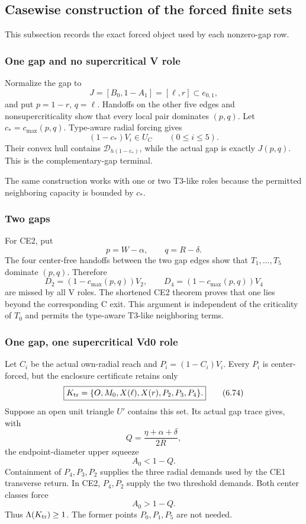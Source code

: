 \subsection{Casewise construction of the forced finite sets}
\label{subsec:new-casewise-witness-details}

This subsection records the exact forced object used by each nonzero-gap row.

\subsubsection{One gap and no supercritical V role}

Normalize the gap to
\[
 J=[B_0,1-A_1]=[\ell,r]\subset e_{0,1},
\]
and put $p=1-r$, $q=\ell$.  Handoffs on the other five edges and
nonsupercriticality show that every local pair dominates $(p,q)$.
Let $c_*=c_{\max}(p,q)$.  Type-aware radial forcing gives
\[
 (1-c_*)V_i\in U_C
 \qquad(0\le i\le5).
 \tag{6.72}
\]
Their convex hull contains $\mathcal D_{h(1-c_*)}$, while the actual gap is
exactly $J(p,q)$.  This is the complementary-gap terminal.

The same construction works with one or two T3-like roles because the
permitted neighboring capacity is bounded by $c_*$.

\subsubsection{Two gaps}

For CE2, put
\[
 p=W-\alpha,\qquad q=R-\delta.
\]
The four center-free handoffs between the two gap edges show that
$T_1,\ldots,T_5$ dominate $(p,q)$.  Therefore
\[
 D_2=(1-c_{\max}(p,q))V_2,
 \qquad
 D_4=(1-c_{\max}(p,q))V_4
 \tag{6.73}
\]
are missed by all V roles.  The shortened CE2 theorem proves that one lies
beyond the corresponding C exit.  This argument is independent of the
criticality of $T_0$ and permits the type-aware T3-like neighboring terms.

\subsubsection{One gap, one supercritical Vd0 role}

Let $C_i$ be the actual own-radial reach and
$P_i=(1-C_i)V_i$.  Every $P_i$ is center-forced, but the enclosure
certificate retains only
\[
 \boxed{
 K_{\rm tr}
 =
 \{O,M_0,X(\ell),X(r),P_2,P_3,P_4\}.
 }
 \tag{6.74}
\]
Suppose an open unit triangle $U'$ contains this set.  Its actual gap trace
gives, with
\[
 Q=\frac{\eta+\alpha+\delta}{2R},
\]
the endpoint-diameter upper squeeze
\[
 A_0<1-Q.
\]
Containment of $P_4,P_3,P_2$ supplies the three radial demands used by the
CE1 transverse return.  In CE2, $P_4,P_2$ supply the two threshold demands.
Both center classes force
\[
 A_0>1-Q.
\]
Thus $\Lambda(K_{\rm tr})\ge1$.  The former points $P_0,P_1,P_5$ are not
needed.

